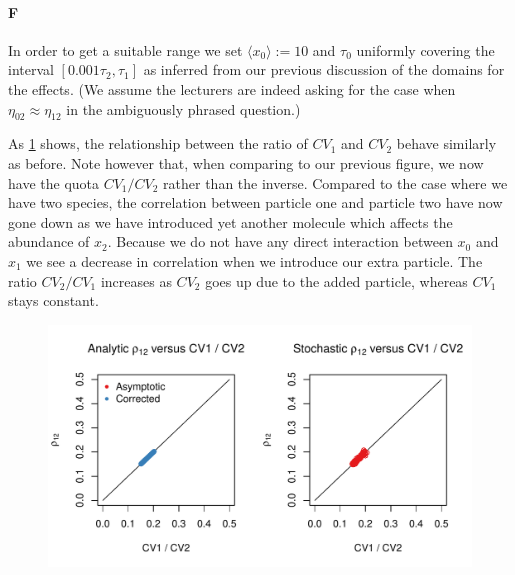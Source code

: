 \documentclass[10pt]{article}\usepackage[]{graphicx}\usepackage[]{color}
\makeatletter
\def\maxwidth{ %
  \ifdim\Gin@nat@width>\linewidth
    \linewidth
  \else
    \Gin@nat@width
  \fi
}
\newcommand{\avg}[1]{\ensuremath{\langle {#1} \rangle}} %
\theoremstyle{plain}
\makeatother
\begin{document}
  
  \paragraph*{F}
    
In order to get a suitable range we set $\avg{x_0} := 10$ and $\tau_0$ uniformly covering the interval $\left[0.001\tau_2, \tau_1\right]$ as inferred from our previous discussion of the domains for the effects. (We assume the lecturers are indeed asking for the case when $\eta_{02} \approx \eta_{12}$ in the ambiguously phrased question.)

As \cref{fig:cv_rel} shows, the relationship between the ratio of $CV_1$ and $CV_2$ behave similarly as before. Note however that, when comparing to our previous figure, we now have the quota $CV_1 / CV_2$ rather than the inverse. Compared to the case where we have two species, the correlation between particle one and particle two have now gone down as we have introduced yet another molecule which affects the abundance of $x_2$. Because we do not have any direct interaction between $x_0$ and $x_1$ we see a decrease in correlation when we introduce our extra particle. The ratio $CV_2 / CV_1$ increases as $CV_2$ goes up due to the added particle, whereas $CV_1$ stays constant.

\begin{Schunk}
\begin{figure}[H]

{\centering \includegraphics[width=\maxwidth]{../figures/twocolumn-cv_rel-1} 

}

\caption[ ]{ }\label{fig:cv_rel}
\end{figure}
\end{Schunk}
\end{document}
